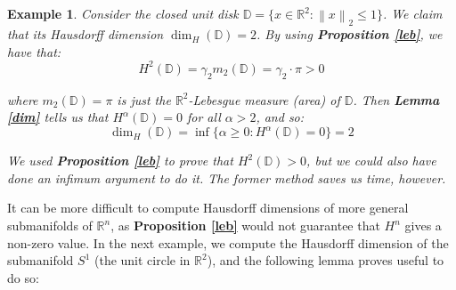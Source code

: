 \documentclass{article}[11pt]
\newcommand*{\D}{\mathbb{D}}
\newcommand*{\R}{\mathbb{R}}
\newcommand\norm[1]{\left\lVert#1\right\rVert}
\theoremstyle{dotless}
\newtheorem{exa}[thm]{Example}
\begin{document}
\begin{exa}
	Consider the closed unit disk $\D = \{ x \in \R^2 : \norm{x}_2 \leqslant 1 \}$.
	We claim that its Hausdorff dimension $\dim_H(\D) = 2$. By using \textbf{Proposition \ref{leb}}, we have that:
	\[ H^2(\D) = \gamma_2 m_2(\D) = \gamma_2 \cdot \pi > 0 \]
	
	\noindent
	where $m_2(\D) = \pi$ is just the $\R^2$-Lebesgue measure (area) of $\D$. Then \textbf{Lemma \ref{dim}} tells us that
	$H^\alpha(\D) = 0$ for all $\alpha > 2$, and so:
	\[ \dim_H(\D) = \inf\{ \alpha \geqslant 0 : H^\alpha(\D) = 0 \} = 2 \]
	
	\noindent
	We used \textbf{Proposition \ref{leb}} to prove that $H^2(\D) > 0$, but we could also have done an infimum argument
	to do it. The former method saves us time, however.
\end{exa}

It can be more difficult to compute Hausdorff dimensions of more general submanifolds of $\R^n$, as 
\textbf{Proposition \ref{leb}} would not guarantee that $H^n$ gives a non-zero value. In the next example, we compute
the Hausdorff dimension of the submanifold $S^1$ (the unit circle in $\R^2$), and the following lemma proves useful to do so:
\end{document}
